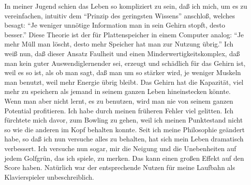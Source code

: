 In meiner Jugend schien das Leben so kompliziert zu sein, daß ich mich, um es zu vereinfachen, intuitiv dem \enquote{Prinzip des geringsten Wissens} anschloß, welches besagt: \enquote{Je weniger unnötige Information man in sein Gehirn stopft, desto besser.}
Diese Theorie ist der für Plattenspeicher in einem Computer analog: \enquote{Je mehr Müll man löscht, desto mehr Speicher hat man zur Nutzung übrig.}
Ich weiß nun, daß dieser Ansatz Faulheit und einen Minderwertigkeitskomplex, daß man kein guter Auswendiglernender sei, erzeugt und schädlich für das Gehirn ist, weil es so ist, als ob man sagt, daß man um so stärker wird, je weniger Muskeln man benutzt, weil mehr Energie übrig bleibt.
Das Gehirn hat die Kapazität, viel mehr zu speichern als jemand in seinem ganzen Leben hineinstecken könnte.
Wenn man aber nicht lernt, es zu benutzen, wird man nie von seinem ganzen Potential profitieren.
Ich habe durch meinen früheren Fehler viel gelitten.
Ich fürchtete mich davor, zum Bowling zu gehen, weil ich meinen Punktestand nicht so wie die anderen im Kopf behalten konnte.
Seit ich meine Philosophie geändert habe, so daß ich nun versuche alles zu behalten, hat sich mein Leben dramatisch verbessert.
Ich versuche nun sogar, mir die Neigung und die Unebenheiten auf jedem Golfgrün, das ich spiele, zu merken.
Das kann einen großen Effekt auf den Score haben.
Natürlich war der entsprechende Nutzen für meine Laufbahn als Klavierspieler unbeschreiblich.


\hypertarget{assoziativ}{}

